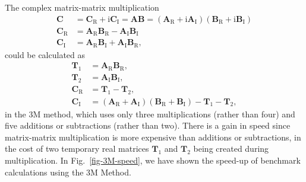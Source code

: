\documentclass[a4paper,11pt,twoside,openright]{book}
\begin{document}
The complex matrix-matrix multiplication
\begin{align}
  \mathbf{C}
  &=\mathbf{C}_{\text{R}}+\text{i}\mathbf{C}_{\text{I}}
    =\mathbf{A}\mathbf{B}
    =(\mathbf{A}_{\text{R}}+\text{i}\mathbf{A}_{\text{I}}) %
      (\mathbf{B}_{\text{R}}+\text{i}\mathbf{B}_{\text{I}})\nonumber\\
  \mathbf{C}_{\text{R}}
  &=\mathbf{A}_{\text{R}}\mathbf{B}_{\text{R}} %
    -\mathbf{A}_{\text{I}}\mathbf{B}_{\text{I}}\nonumber\\
  \mathbf{C}_{\text{I}}
  &=\mathbf{A}_{\text{R}}\mathbf{B}_{\text{I}} %
    +\mathbf{A}_{\text{I}}\mathbf{B}_{\text{R}},
\end{align}
could be calculated as
\begin{align}
  \mathbf{T}_{1}
  &=\mathbf{A}_{\text{R}}\mathbf{B}_{\text{R}},\nonumber\\
  \mathbf{T}_{2}
  &=\mathbf{A}_{\text{I}}\mathbf{B}_{\text{I}},\nonumber\\
  \mathbf{C}_{\text{R}}
  &=\mathbf{T}_{1}-\mathbf{T}_{2},\nonumber\\
  \mathbf{C}_{\text{I}}
  &=(\mathbf{A}_{\text{R}}+\mathbf{A}_{\text{I}})(\mathbf{B}_{\text{R}}+\mathbf{B}_{\text{I}}) %
    -\mathbf{T}_{1}-\mathbf{T}_{2},
\end{align}
in the 3M method\cite{Higham-ASNA-2002}, which uses only three multiplications
(rather than four) and five additions or subtractions (rather than two). There
is a gain in speed since matrix-matrix multiplication is more expensive than
additions or subtractions, in the cost of two temporary real matrices $\mathbf{T}_{1}$
and $\mathbf{T}_{2}$ being created during multiplication. In Fig.~\ref{fig-3M-speed},
we have shown the speed-up of benchmark calculations using the 3M Method.
\end{document}
